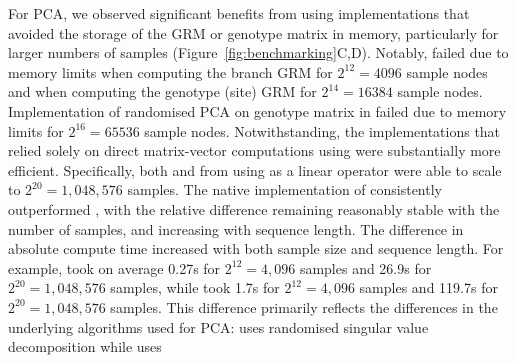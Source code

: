 For PCA, we observed significant benefits from using implementations
that avoided the storage of the GRM or genotype matrix in memory,
particularly for larger numbers of samples (Figure~\ref{fig:benchmarking}C,D).
%
Notably, \tsGRM{} failed due to memory limits
when computing the branch GRM for $2^{12} = 4096$ sample nodes and
when computing the genotype (site) GRM for $2^{14} = 16384$ sample nodes.
%
Implementation of randomised PCA on genotype matrix in \scikitallel{}
failed due to memory limits for $2^{16} = 65536$ sample nodes.
%
Notwithstanding, the implementations that relied solely on
direct matrix-vector computations using \tskit{} were substantially more efficient.
%
Specifically, both \tsPCA{} and \eigsh{} from \scipy{} using \tsGRw{}
as a linear operator were able to scale to $2^{20} = 1,048,576$ samples.
%
The native implementation of \tsPCA{} consistently outperformed \eigsh{},
with the relative difference remaining reasonably stable with the number of samples,
and increasing with sequence length.
%
The difference in absolute compute time increased with both sample size and sequence length.
%
For example, \tsPCA{} took on average
0.27s for $2^{12} = 4,096$ samples and
26.9s for $2^{20} = 1,048,576$ samples,
while \eigsh{} took
  1.7s for $2^{12} = 4,096$ samples and
119.7s for $2^{20} = 1,048,576$ samples.
%
This difference primarily reflects the differences in the underlying algorithms used for PCA:
\tsPCA{} uses randomised singular value decomposition while \eigsh{} uses
